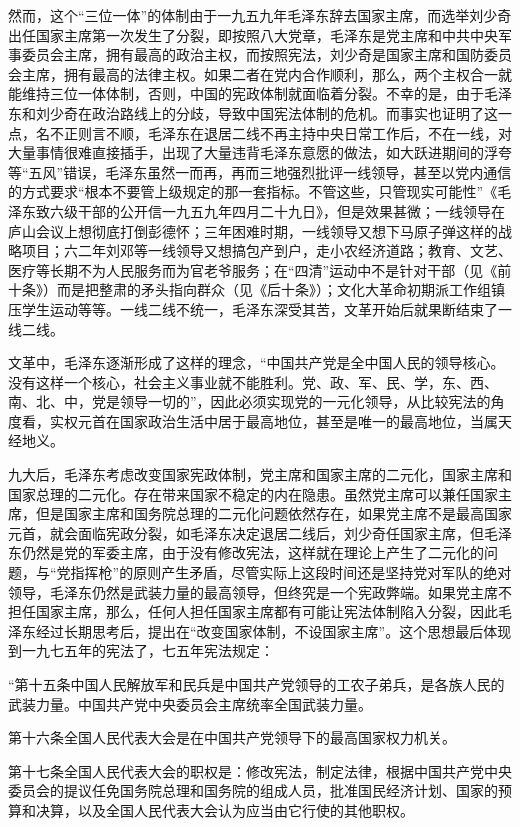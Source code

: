 \begin{maonote}
然而，这个“三位一体”的体制由于一九五九年毛泽东辞去国家主席，而选举刘少奇出任国家主席第一次发生了分裂，即按照八大党章，毛泽东是党主席和中共中央军事委员会主席，拥有最高的政治主权，而按照宪法，刘少奇是国家主席和国防委员会主席，拥有最高的法律主权。如果二者在党内合作顺利，那么，两个主权合一就能维持三位一体体制，否则，中国的宪政体制就面临着分裂。不幸的是，由于毛泽东和刘少奇在政治路线上的分歧，导致中国宪法体制的危机。而事实也证明了这一点，名不正则言不顺，毛泽东在退居二线不再主持中央日常工作后，不在一线，对大量事情很难直接插手，出现了大量违背毛泽东意愿的做法，如大跃进期间的浮夸等“五风”错误，毛泽东虽然一而再，再而三地强烈批评一线领导，甚至以党内通信的方式要求“根本不要管上级规定的那一套指标。不管这些，只管现实可能性”《毛泽东致六级干部的公开信一九五九年四月二十九日》，但是效果甚微；一线领导在庐山会议上想彻底打倒彭德怀；三年困难时期，一线领导又想下马原子弹这样的战略项目；六二年刘邓等一线领导又想搞包产到户，走小农经济道路；教育、文艺、医疗等长期不为人民服务而为官老爷服务；在“四清”运动中不是针对干部（见《前十条》）而是把整肃的矛头指向群众（见《后十条》）；文化大革命初期派工作组镇压学生运动等等。一线二线不统一，毛泽东深受其苦，文革开始后就果断结束了一线二线。

文革中，毛泽东逐渐形成了这样的理念，“中国共产党是全中国人民的领导核心。没有这样一个核心，社会主义事业就不能胜利。党、政、军、民、学，东、西、南、北、中，党是领导一切的”，因此必须实现党的一元化领导，从比较宪法的角度看，实权元首在国家政治生活中居于最高地位，甚至是唯一的最高地位，当属天经地义。

九大后，毛泽东考虑改变国家宪政体制，党主席和国家主席的二元化，国家主席和国家总理的二元化。存在带来国家不稳定的内在隐患。虽然党主席可以兼任国家主席，但是国家主席和国务院总理的二元化问题依然存在，如果党主席不是最高国家元首，就会面临宪政分裂，如毛泽东决定退居二线后，刘少奇任国家主席，但毛泽东仍然是党的军委主席，由于没有修改宪法，这样就在理论上产生了二元化的问题，与“党指挥枪”的原则产生矛盾，尽管实际上这段时间还是坚持党对军队的绝对领导，毛泽东仍然是武装力量的最高领导，但终究是一个宪政弊端。如果党主席不担任国家主席，那么，任何人担任国家主席都有可能让宪法体制陷入分裂，因此毛泽东经过长期思考后，提出在“改变国家体制，不设国家主席”。这个思想最后体现到一九七五年的宪法了，七五年宪法规定：

“第十五条中国人民解放军和民兵是中国共产党领导的工农子弟兵，是各族人民的武装力量。中国共产党中央委员会主席统率全国武装力量。

第十六条全国人民代表大会是在中国共产党领导下的最高国家权力机关。

第十七条全国人民代表大会的职权是：修改宪法，制定法律，根据中国共产党中央委员会的提议任免国务院总理和国务院的组成人员，批准国民经济计划、国家的预算和决算，以及全国人民代表大会认为应当由它行使的其他职权。


\end{maonote}

